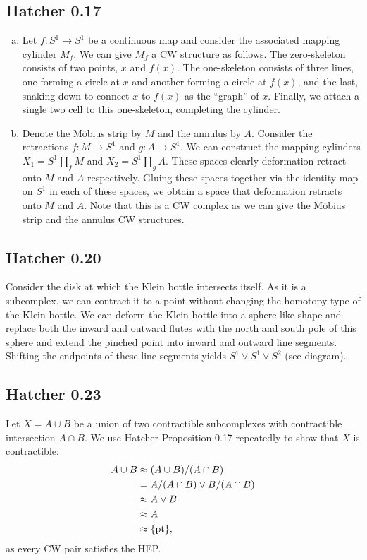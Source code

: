 \documentclass{../mathnotes}
\begin{document}
\subsection*{Hatcher 0.17}
\begin{enumerate}[(a)]
    \item Let $f:S^1\to S^1$ be a continuous map and consider the associated mapping cylinder $M_f$.
        We can give $M_f$ a CW structure as follows. The zero-skeleton consists of two points, $x$
        and $f(x)$. The one-skeleton consists of three lines, one forming a circle at $x$ and another
        forming a circle at $f(x)$, and the last, snaking down to connect $x$ to $f(x)$ as the ``graph''
        of $x$. Finally, we attach a single two cell to this one-skeleton, completing the cylinder.
    \item Denote the M\"obius strip by $M$ and the annulus by $A$. Consider the retractions
        $f:M\to S^1$ and $g:A\to S^1$. We can construct the mapping cylinders $X_1=S^1\coprod_fM$
        and $X_2=S^1\coprod_gA$. These spaces clearly deformation retract onto $M$ and $A$ respectively.
        Gluing these spaces together via the identity map on $S^1$ in each of these spaces, we
        obtain a space that deformation retracts onto $M$ and $A$. Note that this is a CW complex
        as we can give the M\"obius strip and the annulus CW structures.
\end{enumerate}

\subsection*{Hatcher 0.20}
Consider the disk at which the Klein bottle intersects itself. As it is a subcomplex, we can contract
it to a point without changing the homotopy type of the Klein bottle. We can deform the Klein bottle
into a sphere-like shape and replace both the inward and outward flutes with the north and south pole
of this sphere and extend the pinched point into inward and outward line segments. Shifting the endpoints
of these line segments yields $S^1\vee S^1\vee S^2$ (see diagram).


\subsection*{Hatcher 0.23}
Let $X=A\cup B$ be a union of two contractible subcomplexes with contractible intersection
$A\cap B$. We use Hatcher Proposition 0.17 repeatedly to show that $X$ is contractible:
\begin{align*}
    A\cup B &\approx (A\cup B)/(A\cap B)\\
    &=A/(A\cap B)\vee B/(A\cap B)\\
    &\approx A\vee B\\
    &\approx A\\
    &\approx\{\rm pt\},
\end{align*}
as every CW pair satisfies the HEP.
\end{document}
